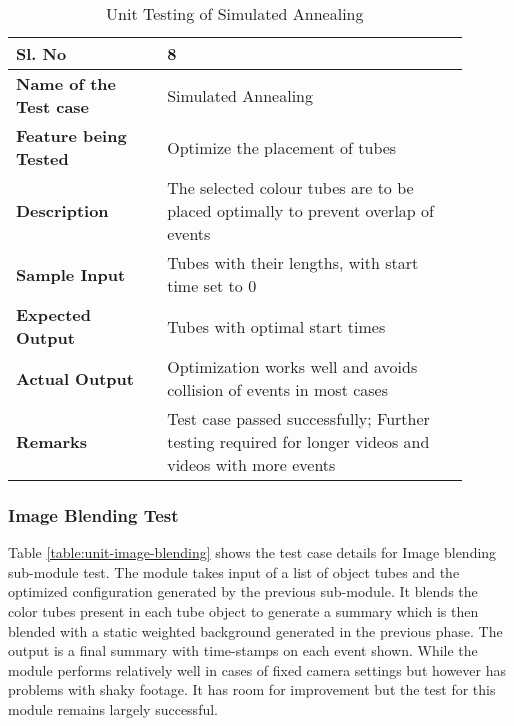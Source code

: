         \FloatBarrier
        \begin{table}[H]
            \begin{tabular}{|p{0.3\linewidth}|p{0.6\linewidth}|}
                \hline
                \textbf{Sl. No }              &\textbf{ 8}\\
                \hline
                \textbf{Name of the Test case}  & Simulated Annealing \\
                \hline
                \textbf{Feature being Tested}  & Optimize the placement of tubes \\
                \hline
                \textbf{Description}           & The selected colour tubes are to be placed optimally to prevent overlap of events \\
                \hline
                \textbf{Sample Input}          & Tubes with their lengths, with start time set to 0 \\
                \hline
                \textbf{Expected Output}       & Tubes with optimal start times \\
                \hline
                \textbf{Actual Output}         & Optimization works well and avoids collision of events in most cases \\
                \hline
                \textbf{Remarks }              & Test case passed successfully; Further testing required for longer videos and videos with more events \\
                \hline
            \end{tabular}
            \caption{Unit Testing of Simulated Annealing}
            \label{table:unit-simulated-annealing}
        \end{table}


        \subsubsection{Image Blending Test}

        Table \ref{table:unit-image-blending} shows the test case details for Image blending sub-module test. The module takes input of a list of object tubes and the optimized configuration generated by the previous sub-module. It blends the color tubes present in each tube object to generate a summary which is then blended with a static weighted background generated in the previous phase. The output is a final summary with time-stamps on each event shown. While the module performs relatively well in cases of fixed camera settings but however has problems with shaky footage. It has room for improvement but the test for this module remains largely successful.


